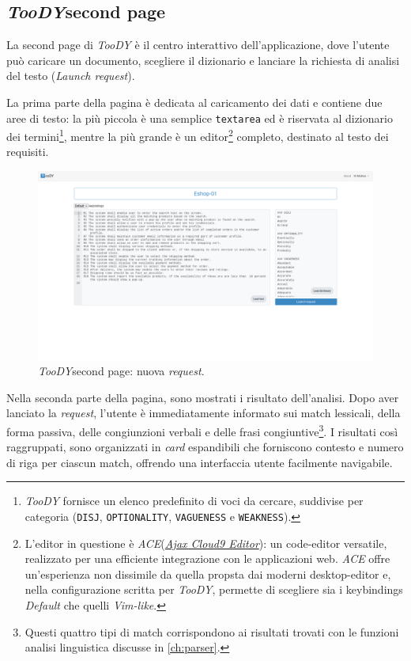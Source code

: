 \documentclass[12pt]{report}
\newcommand{\toody}{\textsl{TooDY}\xspace}
\newcommand{\ace}{\textsl{ACE}\xspace}
\begin{document}
\subsection{\toody \textsf{second page}}
\label{sec:second-page}
La \textsf{second page} di \toody è il centro interattivo dell'applicazione, dove l'utente può caricare un documento, scegliere il dizionario e lanciare la richiesta di analisi del testo (\textit{Launch request}).

La prima parte della pagina è dedicata al caricamento dei dati e contiene due aree di testo: la più piccola è una semplice \texttt{textarea} ed è riservata al dizionario dei termini\footnote{\toody fornisce un elenco predefinito di voci da cercare, suddivise per categoria (\texttt{DISJ}, \texttt{OPTIONALITY}, \texttt{VAGUENESS} e \texttt{WEAKNESS}).}, mentre la più grande è un editor\footnote{L'editor in questione è \ace (\href{https://ace.c9.io/}{\textit{Ajax Cloud9 Editor}}): un code-editor versatile, realizzato per una efficiente integrazione con le applicazioni web. \ace offre un'esperienza non dissimile da quella propsta dai moderni desktop-editor e, nella configurazione scritta per \toody, permette di scegliere sia i keybindings \textsl{Default} che quelli \textsl{Vim-like}.} completo, destinato al testo dei requisiti.

\begin{figure}[H]
\centering
\includegraphics[width=1.0\textwidth]{pagina2-vuota.png}
\caption{\toody \textsf{second page}: nuova \textit{request}.}
\label{fig:pagina1-login}
\end{figure}

Nella seconda parte della pagina, sono mostrati i risultato dell'analisi. Dopo aver lanciato la \textit{request}, l'utente è immediatamente informato sui match lessicali, della forma passiva, delle congiunzioni verbali e delle frasi congiuntive\footnote{Questi quattro tipi di match corrispondono ai risultati trovati con le funzioni analisi linguistica discusse in \cref{ch:parser}.}. I risultati così raggruppati, sono organizzati in \textit{card} espandibili che forniscono contesto e numero di riga per ciascun match, offrendo una interfaccia utente facilmente navigabile.
\end{document}
